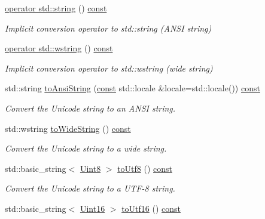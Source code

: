 \begin{DoxyCompactItemize}
\hyperlink{classsf_1_1_string_a3664f92c3b488bf9f60f6b8eafe1844d}{operator std\-::string} () \hyperlink{term__entry_8h_a57bd63ce7f9a353488880e3de6692d5a}{const} 
\begin{DoxyCompactList}\small\item\em Implicit conversion operator to std\-::string (A\-N\-S\-I string) \end{DoxyCompactList}\item 
\hyperlink{classsf_1_1_string_a20d50d45020d1dbe1779dda69ee83732}{operator std\-::wstring} () \hyperlink{term__entry_8h_a57bd63ce7f9a353488880e3de6692d5a}{const} 
\begin{DoxyCompactList}\small\item\em Implicit conversion operator to std\-::wstring (wide string) \end{DoxyCompactList}\item 
std\-::string \hyperlink{classsf_1_1_string_a71d111ccfaf295b8b8be8ca4a3ceb5f4}{to\-Ansi\-String} (\hyperlink{term__entry_8h_a57bd63ce7f9a353488880e3de6692d5a}{const} std\-::locale \&locale=std\-::locale()) \hyperlink{term__entry_8h_a57bd63ce7f9a353488880e3de6692d5a}{const} 
\begin{DoxyCompactList}\small\item\em Convert the Unicode string to an A\-N\-S\-I string. \end{DoxyCompactList}\item 
std\-::wstring \hyperlink{classsf_1_1_string_afd8b085ad7255543e4dc1285389d2d82}{to\-Wide\-String} () \hyperlink{term__entry_8h_a57bd63ce7f9a353488880e3de6692d5a}{const} 
\begin{DoxyCompactList}\small\item\em Convert the Unicode string to a wide string. \end{DoxyCompactList}\item 
std\-::basic\-\_\-string$<$ \hyperlink{namespacesf_a4ef3d630785c4f296f9b4f274c33d78e}{Uint8} $>$ \hyperlink{classsf_1_1_string_a6669450d88e8284fd90d1ba457c30fa0}{to\-Utf8} () \hyperlink{term__entry_8h_a57bd63ce7f9a353488880e3de6692d5a}{const} 
\begin{DoxyCompactList}\small\item\em Convert the Unicode string to a U\-T\-F-\/8 string. \end{DoxyCompactList}\item 
std\-::basic\-\_\-string$<$ \hyperlink{namespacesf_a2fcaf787248b0b83dfb6b145ca348246}{Uint16} $>$ \hyperlink{classsf_1_1_string_abaa37ec39d40f44a2bff4ad3059bef47}{to\-Utf16} () \hyperlink{term__entry_8h_a57bd63ce7f9a353488880e3de6692d5a}{const} 

\end{DoxyCompactItemize}
